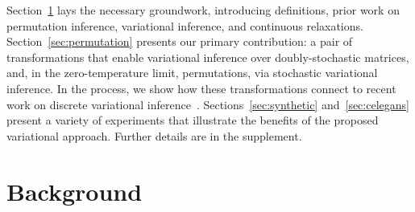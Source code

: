 \documentclass[twoside]{article}
\begin{document}
Section~\ref{sec:background} lays the necessary groundwork,
introducing definitions, prior work on permutation inference,
variational inference, and continuous relaxations.
Section~\ref{sec:permutation} presents our primary contribution: a
pair of transformations that enable variational inference over
doubly-stochastic matrices, and, in the zero-temperature limit,
permutations, via stochastic variational inference.  In the process,
we show how these transformations connect to recent work on discrete
variational inference~\citep{maddison2016concrete,
  jang2016categorical, balog2017lost}.  Sections~\ref{sec:synthetic}
and~\ref{sec:celegans} present a variety of experiments that
illustrate the benefits of the proposed variational approach.
Further details are in the supplement.
  
\section{Background}
\label{sec:background}

\end{document}
